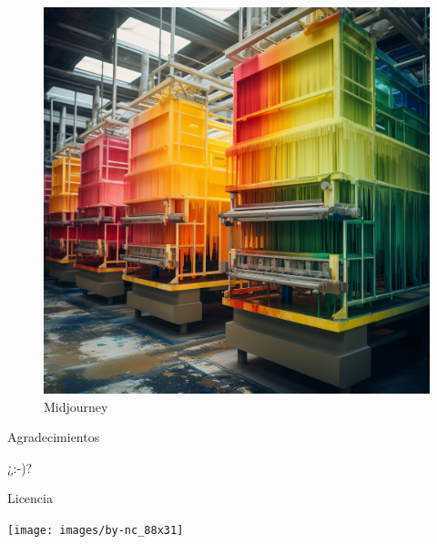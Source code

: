 \documentclass[spanish,a4paper,12pt,oneside]{extreport}
\begin{document}
\begin{figure}
    \centering
    \includegraphics[scale=0.4]{images/PMSP_Midjourney.png}
    \caption{Midjourney}
    \label{fig:PMSP}
\end{figure}

\newpage
\thispagestyle{empty}

{ \flushright

\begin{LARGE}
Agradecimientos
\end{LARGE}

\hspace{3mm}

\begin{large}
¿:-)?

\bigskip

\end{large}

}
\newpage
\thispagestyle{empty}

\bigskip
\begin{LARGE}
Licencia
\end{LARGE}

\begin{center}
\texttt{[image: images/by-nc\_88x31]}\\[5mm]
\end{center}
\end{document}
